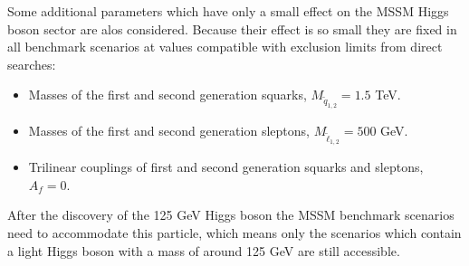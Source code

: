 Some additional parameters which have only a
small effect on the MSSM Higgs boson sector are alos considered.
Because their effect is so small they are
fixed in all benchmark scenarios at values compatible with 
exclusion limits from direct searches:
\begin{itemize}
\item Masses of the first and second generation squarks, $M_{\tilde{q}_{1,2}} = 1.5$ TeV.
\item Masses of the first and second generation sleptons, $M_{\tilde{\ell}_{1,2}} = 500$ GeV.
\item Trilinear couplings of first and second generation squarks and sleptons, $A_f=0$.
\end{itemize}

After the discovery of the 125 GeV Higgs boson the MSSM benchmark
scenarios need to accommodate this particle, which means only the 
scenarios which contain a light Higgs boson with a mass of around 125 GeV
are still accessible.


